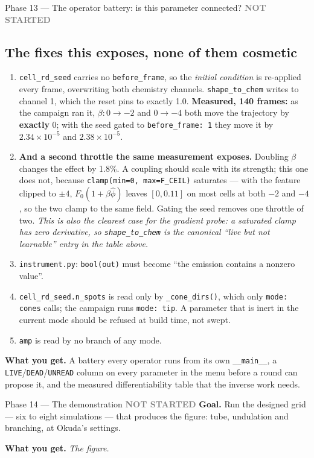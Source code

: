 \documentclass[11pt,a4paper]{article}
\newcommand{\code}[1]{\texttt{#1}}
\newcommand{\todo}{\textcolor{grey}{\textbf{NOT STARTED}}}
\begin{document}
\begin{phasebox}{Phase 13 --- The operator battery: is this parameter connected? \hfill \todo}
\subsection*{The fixes this exposes, none of them cosmetic}
\begin{enumerate}[leftmargin=1.4em]
\item \code{cell\_rd\_seed} carries no \code{before\_frame}, so the \emph{initial condition} is
re-applied every frame, overwriting both chemistry channels. \code{shape\_to\_chem} writes to
channel 1, which the reset pins to exactly 1.0. \textbf{Measured, 140 frames:} as the campaign ran
it, $\beta:0\to-2$ and $0\to-4$ both move the trajectory by \textbf{exactly} $0$; with the seed
gated to \code{before\_frame: 1} they move it by $2.34\times10^{-5}$ and $2.38\times10^{-5}$.
\item \textbf{And a second throttle the same measurement exposes.} Doubling $\beta$ changes the
effect by 1.8\%. A coupling should scale with its strength; this one does not, because
\code{clamp(min=0, max=F\_CEIL)} saturates --- with the feature clipped to $\pm4$,
$F_0(1+\beta\hat\phi)$ leaves $[0,0.11]$ on most cells at both $-2$ and $-4$, so the two clamp to
the same field. Gating the seed removes one throttle of two. \emph{This is also the clearest case
for the gradient probe: a saturated clamp has zero derivative, so \code{shape\_to\_chem} is the
canonical ``live but not learnable'' entry in the table above.}
\item \code{instrument.py}: \code{bool(out)} must become ``the emission contains a nonzero value''.
\item \code{cell\_rd\_seed.n\_spots} is read only by \code{\_cone\_dirs()}, which only
\code{mode: cones} calls; the campaign runs \code{mode: tip}. A parameter that is inert in the
current mode should be refused at build time, not swept.
\item \code{amp} is read by no branch of any mode.
\end{enumerate}

\textbf{What you get.} A battery every operator runs from its own \code{\_\_main\_\_}, a
\code{LIVE}/\code{DEAD}/\code{UNREAD} column on every parameter in the menu before a round can
propose it, and the measured differentiability table that the inverse work needs.
\end{phasebox}

\begin{phasebox}{Phase 14 --- The demonstration \hfill \todo}
\textbf{Goal.} Run the designed grid --- six to eight simulations --- that produces the figure:
tube, undulation and branching, at Okuda's settings.

\textbf{What you get.} \emph{The figure.}
\end{phasebox}
\end{document}
